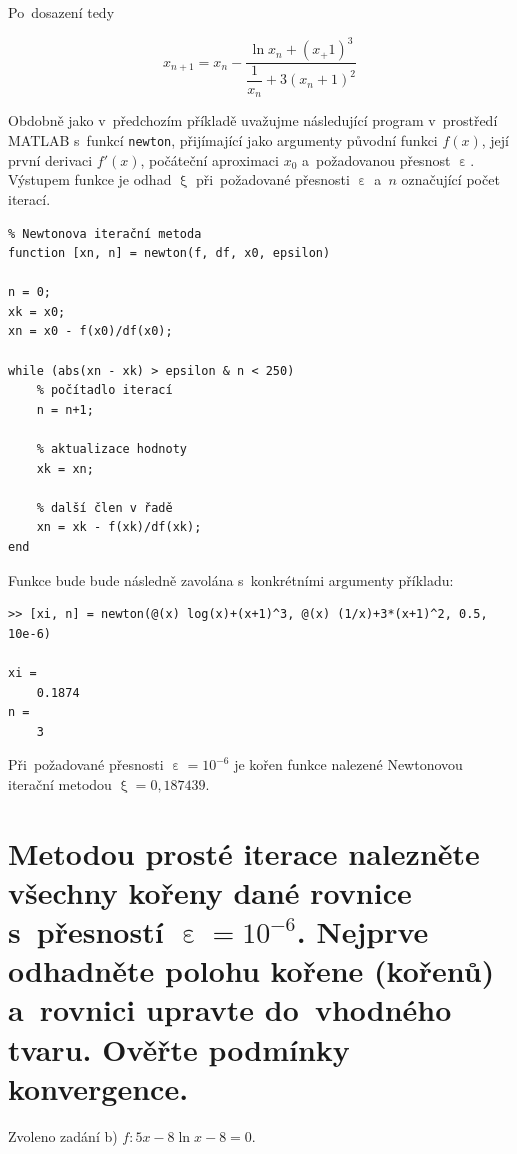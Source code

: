 \documentclass[a4paper,10pt]{article}
\def\doubleunderline#1{\underline{\underline{#1}}}
\begin{document}
Po~dosazení tedy

\begin{equation} 
x_{n+1}=x_n-\dfrac{\ln{x_n}+(x_+1)^{3}}{\dfrac{1}{x_n}+3(x_n+1)^{2}}
\end{equation}

\newpage
\par Obdobně jako v~předchozím příkladě uvažujme následující program v~prostředí MATLAB
s~funkcí \texttt{newton}, přijímající jako argumenty původní funkci $f(x)$, její první
derivaci $f'(x)$, počáteční aproximaci $x_0$ a~požadovanou přesnost $\upepsilon$. Výstupem
funkce je odhad $\upxi$ při~požadované přesnosti $\upepsilon$
a~$n$ označující počet iterací.

\begin{verbatim}
% Newtonova iterační metoda
function [xn, n] = newton(f, df, x0, epsilon)

n = 0;
xk = x0;
xn = x0 - f(x0)/df(x0);

while (abs(xn - xk) > epsilon & n < 250)
    % počítadlo iterací
    n = n+1;

    % aktualizace hodnoty
    xk = xn;
	
    % další člen v řadě
    xn = xk - f(xk)/df(xk);
end
\end{verbatim}

\par Funkce bude bude následně zavolána s~konkrétními argumenty příkladu:

\begin{verbatim}
>> [xi, n] = newton(@(x) log(x)+(x+1)^3, @(x) (1/x)+3*(x+1)^2, 0.5, 10e-6)

xi =
    0.1874    
n =
    3
\end{verbatim}

\par Při~požadované přesnosti $\upepsilon=10^{-6}$ je kořen funkce nalezené Newtonovou
iterační metodou \doubleunderline{$\upxi=0,187439$}.

\newpage
\section{Metodou prosté iterace nalezněte všechny kořeny dané rovnice s~přesností
$\upepsilon=10^{-6}$. Nejprve odhadněte polohu kořene (kořenů) a~rovnici upravte
do~vhodného tvaru. Ověřte podmínky konvergence.}

\par Zvoleno zadání b) $f : 5x-8\ln{x}-8=0$.
\vfill
\end{document}

